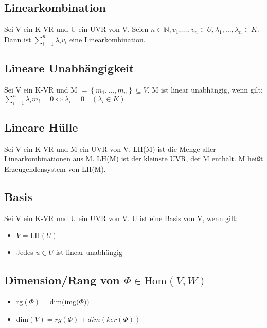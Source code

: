 \documentclass[ngerman,11pt,a4paper
,pdftex]{article}
\newcommand{\f}[1]{$#1$}
\theoremstyle{nodot}
\theoremstyle{nodot}
\begin{document}
\begin{multicols*}{3}
        \begin{tcolorbox}[colback=white,bottom=10pt, top=10pt]
          \subsection*{Linearkombination}
          Sei V ein K-VR und U ein UVR von V. Seien \f{n\in \mathbb{N}, v_1,...,v_n\in U, \lambda_1,...,\lambda_n\in K.} Dann ist \f{\sum_{i=1}^{n}\lambda_iv_i} eine Linearkombination.\\[10pt]

          \subsection*{Lineare Unabhängigkeit}
          Sei V ein K-VR und M \f{= \left\{m_1,...,m_n\right\}\subseteq V}. M ist linear unabhängig, wenn gilt:\\
          \f{\sum_{i=1}^{n}\lambda_im_i=0\Leftrightarrow \lambda_i=0\quad (\lambda_i\in K)}\\[10pt]

          \subsection*{Lineare Hülle}
          Sei V ein K-VR und M ein UVR von V. LH(M) ist die Menge aller Linearkombinationen aus M. LH(M) ist der kleinste UVR, der M enthält.
          M heißt Erzeugendensystem von LH(M).\\[10pt]
          \subsection*{Basis}
          Sei V ein K-VR und U ein UVR von V. U ist eine Basis von V, wenn gilt:
          \begin{itemize}
            \item \f{V = \text{LH}(U)}
            \item Jedes \f{u\in U} ist linear unabhängig
          \end{itemize}
          \subsection*{Dimension/Rang von \f{\Phi\in \text{Hom}(V,W)}}
          \begin{itemize}
            \item rg\f{(\Phi) = \text{dim(img(}\Phi))}
            \item dim\f{(V)=rg(\Phi)+dim(ker(\Phi))}
          \end{itemize}

\end{tcolorbox}
\end{multicols*}
\end{document}
